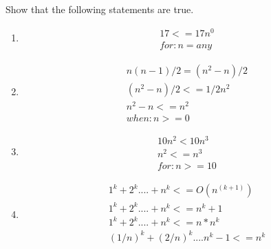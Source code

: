 \documentclass{article}
\begin{document}
Show that the following statements are true. 
			\begin{enumerate}
				\item \begin{align*}17 <= 17n^0	\\for: n=any\end{align*}
				\item \begin{align*}n(n-1)/2 = (n^2-n)/2   \\(n^2-n)/2 <= 1/2n^2\\	 	n^2-n <= n^2\\when:  n>=0		\end{align*}
				\item \begin{align*}10n^2 < 10n^3\\	 n^2 <=n^3\\	for: n >= 10\end{align*}
				\item \begin{align*}
				1^k+2^k .... + n^k <=O(n^(k+1))\\
				1^k+2^k .... + n^k <= n^k+1\\
				1^k+2^k .... + n^k <= n*n^k\\
				(1/n)^k + (2/n)^k .... n^k-1 <= n^k\\
				\end{align*}
			\end{enumerate}
\end{document}
